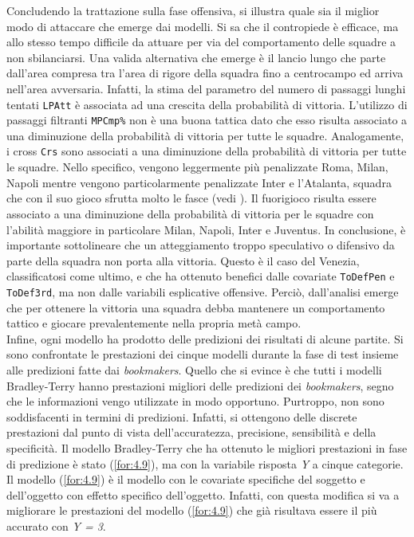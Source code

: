 Concludendo la trattazione sulla fase offensiva, si illustra quale sia il miglior modo di attaccare che emerge dai modelli. Si sa che il contropiede è efficace, ma allo stesso tempo difficile da attuare per via del comportamento delle squadre a non sbilanciarsi. Una valida alternativa che emerge è il lancio lungo che parte dall'area compresa tra l'area di rigore della squadra fino a centrocampo ed arriva nell'area avversaria. Infatti, la stima del parametro del numero di passaggi lunghi tentati \texttt{LPAtt} è associata ad una crescita della probabilità di vittoria. L'utilizzo di passaggi filtranti \texttt{MPCmp\%} non è una buona tattica dato che esso risulta associato a una diminuzione della probabilità di vittoria per tutte le squadre. Analogamente, i cross \texttt{Crs} sono associati a una diminuzione della probabilità di vittoria per tutte le squadre. Nello specifico, vengono leggermente più penalizzate Roma, Milan, Napoli mentre vengono particolarmente penalizzate Inter e l'Atalanta, squadra che con il suo gioco sfrutta molto le fasce (vedi \textit{\cite{ataGioco}}). Il fuorigioco risulta essere associato a una diminuzione della probabilità di vittoria per le squadre con l'abilità maggiore in particolare Milan, Napoli, Inter e Juventus. In conclusione, è importante sottolineare che un atteggiamento troppo speculativo o difensivo da parte della squadra non porta alla vittoria. Questo è il caso del Venezia, classificatosi come ultimo, e che ha ottenuto benefici dalle covariate \texttt{ToDefPen} e \texttt{ToDef3rd}, ma non dalle variabili esplicative offensive. Perciò, dall'analisi emerge che per ottenere la vittoria una squadra debba mantenere un comportamento tattico e giocare prevalentemente nella propria metà campo.\\
Infine, ogni modello ha prodotto delle predizioni dei risultati di alcune partite. Si sono confrontate le prestazioni dei cinque modelli durante la fase di test insieme alle predizioni fatte dai \emph{bookmakers}. Quello che si evince è che tutti i modelli Bradley-Terry hanno prestazioni migliori delle predizioni dei \emph{bookmakers}, segno che le informazioni vengo utilizzate in modo opportuno. Purtroppo, non sono soddisfacenti in termini di predizioni. Infatti, si ottengono delle discrete prestazioni dal punto di vista dell'accuratezza, precisione, sensibilità e della specificità. Il modello Bradley-Terry che ha ottenuto le migliori prestazioni in fase di predizione è stato (\ref{for:4.9}), ma con la variabile risposta \emph{Y} a cinque categorie. Il modello (\ref{for:4.9}) è il modello con le covariate specifiche del soggetto e dell'oggetto con effetto specifico dell'oggetto. Infatti, con questa modifica si va a migliorare le prestazioni del modello (\ref{for:4.9}) che già risultava essere il più accurato con \emph{Y = 3}.

